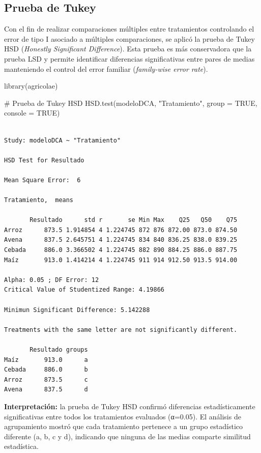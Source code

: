 \documentclass[
  spanish,
  letterpaper,
  DIV=11,
  numbers=noendperiod]{scrreprt}
\newenvironment{Shaded}{\begin{snugshade}}{\end{snugshade}}
\newcommand{\AttributeTok}[1]{\textcolor[rgb]{0.40,0.45,0.13}{#1}}
\newcommand{\CommentTok}[1]{\textcolor[rgb]{0.37,0.37,0.37}{#1}}
\newcommand{\ConstantTok}[1]{\textcolor[rgb]{0.56,0.35,0.01}{#1}}
\newcommand{\FunctionTok}[1]{\textcolor[rgb]{0.28,0.35,0.67}{#1}}
\newcommand{\NormalTok}[1]{\textcolor[rgb]{0.00,0.23,0.31}{#1}}
\newcommand{\StringTok}[1]{\textcolor[rgb]{0.13,0.47,0.30}{#1}}
\begin{document}
\subsection{Prueba de Tukey}\label{prueba-de-tukey}

Con el fin de realizar comparaciones múltiples entre tratamientos
controlando el error de tipo I asociado a múltiples comparaciones, se
aplicó la prueba de Tukey HSD (\emph{Honestly Significant Difference}).
Esta prueba es más conservadora que la prueba LSD y permite identificar
diferencias significativas entre pares de medias manteniendo el control
del error familiar (\emph{family-wise error rate}).

\begin{Shaded}
\begin{Highlighting}[]
\FunctionTok{library}\NormalTok{(agricolae)}

\CommentTok{\# Prueba de Tukey HSD}
\FunctionTok{HSD.test}\NormalTok{(modeloDCA, }\StringTok{"Tratamiento"}\NormalTok{, }\AttributeTok{group =} \ConstantTok{TRUE}\NormalTok{, }\AttributeTok{console =} \ConstantTok{TRUE}\NormalTok{)}
\end{Highlighting}
\end{Shaded}

\begin{verbatim}

Study: modeloDCA ~ "Tratamiento"

HSD Test for Resultado 

Mean Square Error:  6 

Tratamiento,  means

       Resultado      std r       se Min Max    Q25   Q50    Q75
Arroz      873.5 1.914854 4 1.224745 872 876 872.00 873.0 874.50
Avena      837.5 2.645751 4 1.224745 834 840 836.25 838.0 839.25
Cebada     886.0 3.366502 4 1.224745 882 890 884.25 886.0 887.75
Maíz       913.0 1.414214 4 1.224745 911 914 912.50 913.5 914.00

Alpha: 0.05 ; DF Error: 12 
Critical Value of Studentized Range: 4.19866 

Minimun Significant Difference: 5.142288 

Treatments with the same letter are not significantly different.

       Resultado groups
Maíz       913.0      a
Cebada     886.0      b
Arroz      873.5      c
Avena      837.5      d
\end{verbatim}

\textbf{Interpretación:} la prueba de Tukey HSD confirmó diferencias
estadísticamente significativas entre todos los tratamientos evaluados
(α=0.05). El análisis de agrupamiento mostró que cada tratamiento
pertenece a un grupo estadístico diferente (a, b, c y d), indicando que
ninguna de las medias comparte similitud estadística.
\end{document}
